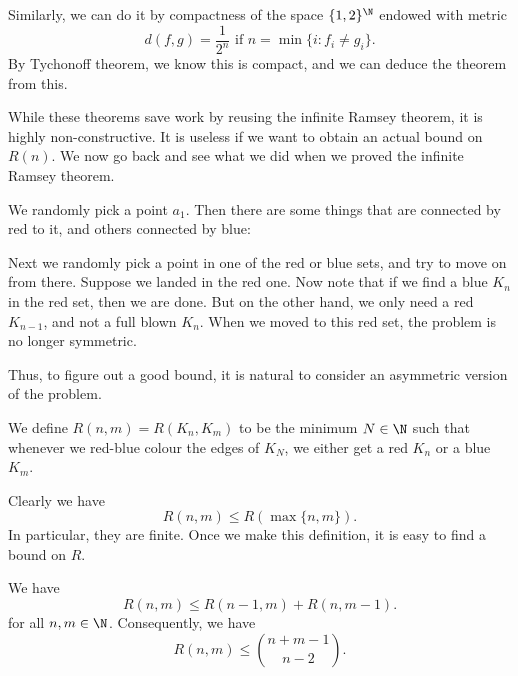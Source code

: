 \documentclass[a4paper]{article}
\begin{document}
Similarly, we can do it by compactness of the space $\{1, 2\}^\N$ endowed with metric
\[
  d(f, g) = \frac{1}{2^n}\text{ if } n = \min \{i: f_i \not= g_i\}.
\]
By Tychonoff theorem, we know this is compact, and we can deduce the theorem from this. %

While these theorems save work by reusing the infinite Ramsey theorem, it is highly non-constructive. It is useless if we want to obtain an actual bound on $R(n)$. We now go back and see what we did when we proved the infinite Ramsey theorem.

We randomly pick a point $a_1$. Then there are some things that are connected by red to it, and others connected by blue:
\begin{center}
\end{center}
Next we randomly pick a point in one of the red or blue sets, and try to move on from there. Suppose we landed in the red one. Now note that if we find a blue $K_n$ in the red set, then we are done. But on the other hand, we only need a red $K_{n - 1}$, and not a full blown $K_n$. When we moved to this red set, the problem is no longer symmetric.

Thus, to figure out a good bound, it is natural to consider an asymmetric version of the problem.
\begin{defi}
  We define $R(n, m) = R(K_n, K_m)$ to be the minimum $N \in \N$ such that whenever we red-blue colour the edges of $K_N$, we either get a red $K_n$ or a blue $K_m$.
\end{defi}

Clearly we have
\[
  R(n, m) \leq R(\max\{n, m\}).
\]
In particular, they are finite. Once we make this definition, it is easy to find a bound on $R$.
\begin{thm}
  We have
  \[
    R(n, m) \leq R(n - 1, m) + R(n, m - 1).
  \]
  for all $n, m \in \N$. Consequently, we have
  \[
    R(n, m) \leq \binom{n + m - 1}{n - 2}.
  \]
\end{thm}
\end{document}
